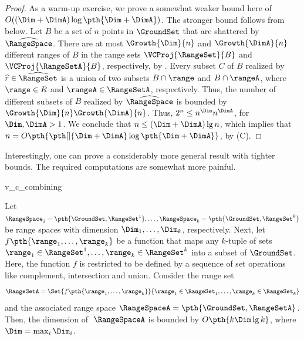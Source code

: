 \begin{proof}
    As a warm-up exercise, we prove a somewhat weaker bound here of
    $O( (\Dim + \DimA) \log \pth{\Dim + \DimA} )$. The stronger bound
    follows from  below.  Let $B$ be a set of
    $n$ points in $\GroundSet$ that are shattered by
    $\widehat{\RangeSpace}$. There are at most $\Growth{\Dim}{n }$ and
    $\Growth{\DimA}{n }$ different ranges of $B$ in the range sets
    $\VCProj{\RangeSet}{B}$ and $\VCProj{\RangeSetA}{B}$,
    respectively, by . Every subset $C$ of $B$ realized
    by $\widehat{r} \in \widehat{\RangeSet}$ is a union of two subsets
    $B \cap \range$ and $B \cap \rangeA$, where $\range \in R$ and
    $\rangeA \in \RangeSetA$, respectively.  Thus, the number of
    different subsets of $B$ realized by $\widehat{\RangeSpace}$ is
    bounded by $\Growth{\Dim}{n} \Growth{\DimA}{n }$. Thus, $2^n \leq
    n^{\Dim} n^{\DimA}$, for $\Dim, \DimA > 1$.  We conclude that $n
    \leq (\Dim + \DimA) \lg n$, which implies that $n = O \pth{
       \pth[]{\Dim + \DimA} \log\pth{ \Dim + \DimA}}$, by
    (C).
\end{proof}


Interestingly, one can prove a considerably more general result with
tighter bounds. The required computations are somewhat more painful.

\begin{fragment}{v_c_combining}
    \begin{theorem}
        Let
        $\RangeSpace_1 = \pth{\GroundSet,\RangeSet^1}, \ldots,
        \RangeSpace_k = \pth{\GroundSet,\RangeSet^k}$
        be range spaces with \VC dimension $\Dim_1, \ldots, \Dim_k$,
        respectively.  Next, let $f\pth{ \range_1, \ldots, \range_k}$
        be a function that maps any $k$-tuple of sets
        $\range_1 \in \RangeSet^1, \ldots, \range_k \in \RangeSet^k$
        into a subset of $\GroundSet$. Here, the function $f$ is
        restricted to be defined by a sequence of set operations like
        complement, intersection and union.  Consider the range set
        \begin{align*}
          \RangeSetA%
          =%
          \Set{ f\pth{ \range_1, \ldots, \range_k}}{ \range_1
          \in \RangeSet_1, \ldots, \range_k \in \RangeSet_k \bigr.}
        \end{align*}
        and the associated range space $\RangeSpaceA =
        \pth{\GroundSet, \RangeSetA}$. Then, the \VC dimension of
        $\;\RangeSpaceA$ is bounded by $O\pth{ k \Dim \lg k}$, where
        $\Dim = \max_i \Dim_i$.
        
    \end{theorem}
\end{fragment}

